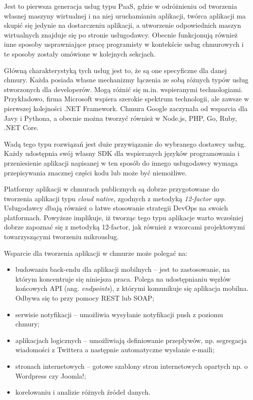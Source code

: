 \documentclass[12pt,a4paper,twoside,titlepage,openright]{book}
\begin{document}
Jest to pierwsza generacja usług typu PaaS, gdzie w odróżnieniu od tworzenia własnej maszyny wirtualnej i na niej uruchamianiu aplikacji, twórca aplikacji ma skupić się jedynie na dostarczeniu aplikacji, a utworzenie odpowiednich maszyn wirtualnych znajduje się po stronie usługodawcy. Obecnie funkcjonują również inne sposoby usprawniające pracę programisty w kontekście usług chmurowych i te sposoby zostały omówione w kolejnych sekcjach.

Główną charakterystyką tych usług jest to, że są one specyficzne dla danej chmury. Każda posiada własne mechanizmy łączenia ze sobą różnych typów usług stworzonych dla developerów. Mogą różnić się m.in. wspieranymi technologiami. Przykładowo, firma Microsoft wspiera szerokie spektrum technologii, ale zawsze w pierwszej kolejności .NET Framework. Chmura Google zaczynała od wsparcia dla Javy i Pythona, a obecnie można tworzyć również w Node.js, PHP, Go, Ruby, .NET Core.

Wadą tego typu rozwiązań jest duże przywiązanie do wybranego dostawcy usług. Każdy udostępnia swój własny SDK dla wspieranych języków programowania i przeniesienie aplikacji napisanej w ten sposób do innego usługodawcy wymaga przepisywania znacznej części kodu lub może być niemożliwe.

Platformy aplikacji w chmurach publicznych są dobrze przygotowane do tworzenia aplikacji typu \textit{cloud native}, zgodnych z metodyką \textit{12-factor app}. Usługodawcy dbają również o łatwe stosowanie strategii DevOps na swoich platformach. Powyższe implikuje, iż tworząc tego typu aplikacje warto wcześniej dobrze zapoznać się z metodyką 12-factor, jak również z wzorcami projektowymi towarzyszącymi tworzeniu mikrousług. 

Wsparcie dla tworzenia aplikacji w chmurze może polegać na:
\begin{itemize}
\item budowaniu back-endu dla aplikacji mobilnych -- jest to zastosowanie, na którym koncentruje się niniejsza praca. Polega na udostępnianiu węzłów końcowych API (ang. \textit{endpoints}), z którymi komunikuje się aplikacja mobilna. Odbywa się to przy pomocy REST lub SOAP;
\item serwisie notyfikacji -- umożliwia wysyłanie notyfikacji push z poziomu chmury;
\item aplikacjach logicznych -- umożliwiają definiowanie przepływów, np. segregacja wiadomości z Twittera a następnie automatyczne wysłanie e-maili;
\item stronach internetowych -- gotowe szablony stron internetowych opartych np. o Wordpress czy Joomla!;
\item korelowaniu i analizie różnych źródeł danych.
\end{itemize}
\end{document}
